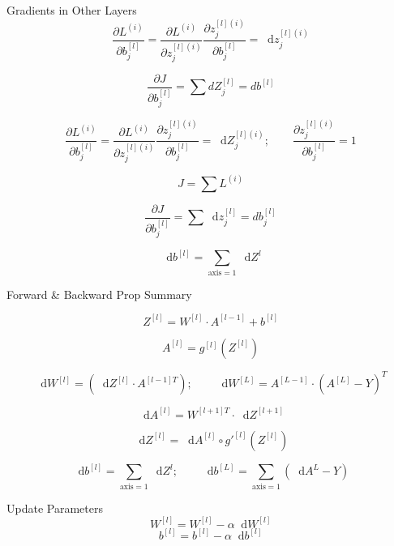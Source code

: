 \documentclass{beamer}
\newcommand{\dd}{\mathop{}\!\text{d}}
\begin{document}
\begin{frame}{Gradients in Other Layers}
\[
\frac{\partial L^{(i)}}{\partial b_j^{[l]}} = \frac{\partial L^{(i)}}{\partial z_j^{[l](i)}}  \frac{\partial z_j^{[l](i)}}{\partial b_j^{[l]}} = \dd z_j^{[l](i)}
\]

\[
\frac{\partial J}{\partial b_j^{[l]}} = \sum dZ_j^{[l]} = db^{[l]}
\]

\[
\frac{\partial L^{(i)}}{\partial b_j^{[l]}} = \frac{\partial L^{(i)}}{\partial z_j^{[l](i)}}  \frac{\partial z_j^{[l](i)}}{\partial b_j^{[l]}} = \dd Z_j^{[l](i)}; \quad \quad \frac{\partial z_j^{[l](i)}}{\partial b_j^{[l]}} = 1
\]

\[
J = \sum L^{(i)}
\]

\[
\frac{\partial J}{\partial b_j^{[l]}} = \sum \dd z_j^{[l]} = db_j^{[l]}
\]

\[
\dd  b^{[l]} = \sum_{\text{axis}=1} \dd  Z^{l}
\]
\end{frame}

\begin{frame}{Forward \& Backward Prop Summary}


\[
Z^{[l]} = W^{[l]} \cdot A^{[l-1]} + b^{[l]}
\]

\[
A^{[l]} = g^{[l]}(Z^{[l]})
\]



\[
\dd  W^{[l]} =  (\dd  Z^{[l]} \cdot A^{[l-1]T}); \quad \quad \dd W^{[L]} = A^{[L-1]} \cdot {(A^{[L]}  -Y)}^T
\]


\[
\dd  A^{[l]} = W^{[l+1]T} \cdot \dd  Z^{[l+1]}
\]

\[
\dd  Z^{[l]} = \dd  A^{[l]} \circ g'^{[l]}(Z^{[l]})
\]


\[
\dd  b^{[l]} = \sum_{\text{axis}=1} \dd  Z^{l}; \quad \quad \dd b^{[L]} = \sum_{\text{axis}=1} (\dd A^{L} - Y)
\]



\end{frame}

\begin{frame}{Update Parameters}
\[ W^{[l]} = W^{[l]}  - \alpha \dd  W^{[l]}  \]
\[ b^{[l]} = b^{[l]}  - \alpha\dd  b^{[l]}  \]
\end{frame}
\end{document}
